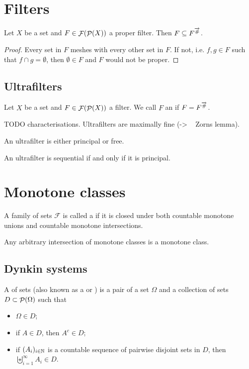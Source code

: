 \section{Filters}

\begin{proposition}
Let $X$ be a set and $F\in\mathop{\mathcal{F}}(\mathop{\mathcal{P}}(X))$ a proper filter. Then $F \subseteq F^{\overrightarrow{\mathbin{\#}}}$.
\end{proposition}
\begin{proof}
Every set in $F$ meshes with every other set in $F$. If not, i.e. $f,g\in F$ such that $f\cap g = \emptyset$, then $\emptyset\in F$ and $F$ would not be proper.
\end{proof}

\subsection{Ultrafilters}
\begin{definition}
Let $X$ be a set and $F\in\mathop{\mathcal{F}}(\mathop{\mathcal{P}}(X))$ a filter. We call $F$ an  if $F = F^{\overrightarrow{\mathbin{\#}}}$.
\end{definition}

TODO characterisations. Ultrafilters are maximally fine (-> ~ Zorns lemma).

\begin{proposition}
An ultrafilter is either principal or free.
\end{proposition}

\begin{proposition}
An ultrafilter is sequential \textup{if and only if} it is principal.
\end{proposition}

\section{Monotone classes}
\begin{definition}
A family of sets $\mathcal{F}$ is called a  if it is closed under both countable monotone unions and countable monotone intersections.
\end{definition}
\begin{lemma}
Any arbitrary intersection of monotone classes is a monotone class.
\end{lemma}

\subsection{Dynkin systems}
\begin{definition}
A  of sets (also known as a  or ) is a pair of a set $\Omega$ and a collection of sets $D\subset\mathop{\mathcal{P}}(\Omega)$ such that
\begin{itemize}
\item $\Omega\in D$;
\item if $A\in D$, then $A^c\in D$;
\item if $(A_i)_{i\in\mathbb{N}}$ is a countable sequence of pairwise disjoint sets in $D$, then $\biguplus_{i=1}^\infty A_i\in D$.
\end{itemize}
\end{definition}

